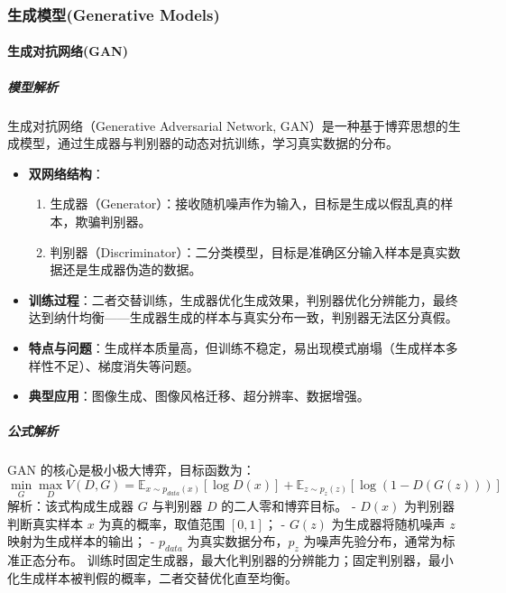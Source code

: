 \documentclass[12pt]{article}
\begin{document}
\subsubsection{生成模型(Generative Models)}
\paragraph{生成对抗网络(GAN)}
\subparagraph{模型解析}
生成对抗网络（Generative Adversarial Network, GAN）是一种基于博弈思想的生成模型，通过生成器与判别器的动态对抗训练，学习真实数据的分布。
\begin{itemize}
    \item \textbf{双网络结构}：
    \begin{enumerate}
        \item 生成器（Generator）：接收随机噪声作为输入，目标是生成以假乱真的样本，欺骗判别器。
        \item 判别器（Discriminator）：二分类模型，目标是准确区分输入样本是真实数据还是生成器伪造的数据。
    \end{enumerate}
    \item \textbf{训练过程}：二者交替训练，生成器优化生成效果，判别器优化分辨能力，最终达到纳什均衡——生成器生成的样本与真实分布一致，判别器无法区分真假。
    \item \textbf{特点与问题}：生成样本质量高，但训练不稳定，易出现模式崩塌（生成样本多样性不足）、梯度消失等问题。
    \item \textbf{典型应用}：图像生成、图像风格迁移、超分辨率、数据增强。
\end{itemize}

\subparagraph{公式解析}
GAN 的核心是极小极大博弈，目标函数为：
\[
\min_G \max_D V(D,G) = \mathbb{E}_{x\sim p_{data}(x)} \left[ \log D(x) \right] + \mathbb{E}_{z\sim p_z(z)} \left[ \log\left(1 - D(G(z))\right) \right]
\]
解析：该式构成生成器 $G$ 与判别器 $D$ 的二人零和博弈目标。
- $D(x)$ 为判别器判断真实样本 $x$ 为真的概率，取值范围 $[0,1]$；
- $G(z)$ 为生成器将随机噪声 $z$ 映射为生成样本的输出；
- $p_{data}$ 为真实数据分布，$p_z$ 为噪声先验分布，通常为标准正态分布。
训练时固定生成器，最大化判别器的分辨能力；固定判别器，最小化生成样本被判假的概率，二者交替优化直至均衡。
\end{document}
